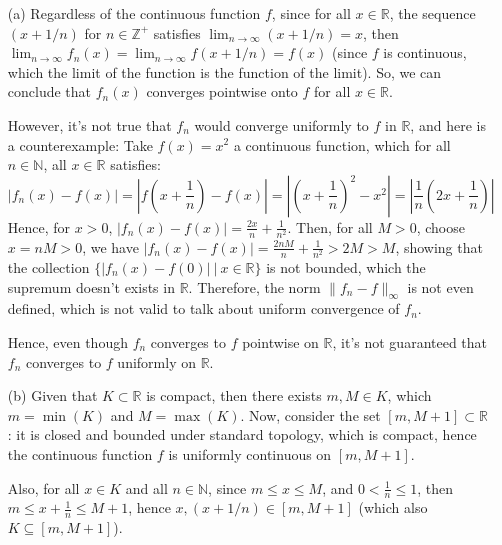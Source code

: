 \documentclass{article}
\begin{document}
\begin{itemize}
    \item[(a)] Regardless of the continuous function $f$,
    since for all $x\in\mathbb{R}$, the sequence $(x+1/n)$ for $n\in\mathbb{Z}^+$ satisfies $\lim_{n\rightarrow\infty}(x+1/n)=x$,
    then $\lim_{n\rightarrow\infty}f_n(x)=\lim_{n\rightarrow\infty} f(x+1/n) = f(x)$ (since $f$ is continuous, which the limit of the function is the function of the limit).
    So, we can conclude that $f_n(x)$ converges pointwise onto $f$ for all $x\in\mathbb{R}$.

    However, it's not true that $f_n$ would converge uniformly to $f$ in $\mathbb{R}$, and here is a counterexample: 
    Take $f(x)=x^2$ a continuous function, which for all $n\in\mathbb{N}$, all $x\in\mathbb{R}$ satisfies: 
    $$|f_n(x)-f(x)| = \left|f\left(x+\frac{1}{n}\right)-f(x)\right|=\left|\left(x+\frac{1}{n}\right)^2-x^2\right| = \left|\frac{1}{n}\left(2x+\frac{1}{n}\right)\right|$$
    Hence, for $x>0$, $|f_n(x)-f(x)| = \frac{2x}{n}+\frac{1}{n^2}$. Then, for all $M>0$, choose $x=nM>0$, we have $|f_n(x)-f(x)| = \frac{2nM}{n}+\frac{1}{n^2} > 2M > M$,
    showing that the collection $\{|f_n(x)-f(0)|\ |\ x\in\mathbb{R}\}$ is not bounded, which the supremum doesn't exists in $\mathbb{R}$.
    Therefore, the norm $\|f_n-f\|_\infty$ is not even defined, which is not valid to talk about uniform convergence of $f_n$.

    Hence, even though $f_n$ converges to $f$ pointwise on $\mathbb{R}$, it's not guaranteed that $f_n$ converges to $f$ uniformly on $\mathbb{R}$.
    
    \hfill

    \item[(b)] Given that $K\subset \mathbb{R}$ is compact, then there exists $m,M\in K$, which $m=\min(K)$ and $M=\max(K)$.
    Now, consider the set $[m,M+1]\subset\mathbb{R}$: it is closed and bounded under standard topology, which is compact, hence the continuous function $f$ is uniformly continuous on $[m,M+1]$.

    Also, for all $x\in K$ and all $n\in\mathbb{N}$, since $m\leq x\leq M$, and $0<\frac{1}{n}\leq 1$, then $m\leq x+\frac{1}{n}\leq M+1$,
    hence $x,(x+1/n)\in [m,M+1]$ (which also $K\subseteq [m,M+1]$).


\end{itemize}
\end{document}
